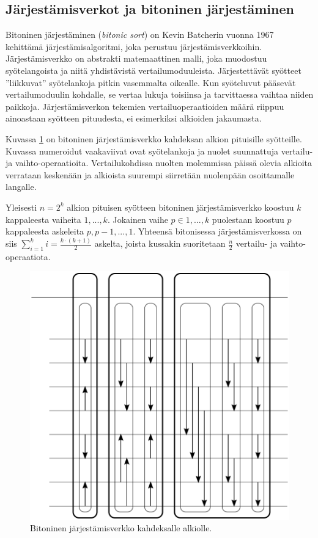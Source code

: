 \documentclass[a4paper,11pt]{article}
\newcommand{\engl}[1]{\foreignlanguage{english}{\em #1}}
\begin{document}
\subsection{Järjestämisverkot ja bitoninen järjestäminen}

Bitoninen järjestäminen (\engl{bitonic sort}) on Kevin Batcherin vuonna 1967 kehittämä järjestämisalgoritmi, joka perustuu järjestämisverkkoihin. Järjestämisverkko on abstrakti matemaattinen malli, joka muodostuu syötelangoista ja niitä yhdistävistä vertailumoduuleista. Järjestettävät syötteet ''liikkuvat'' syötelankoja pitkin vasemmalta oikealle. Kun syöteluvut pääsevät vertailumoduulin kohdalle, se vertaa lukuja toisiinsa ja tarvittaessa vaihtaa niiden paikkoja. Järjestämisverkon tekemien vertailuoperaatioiden määrä riippuu ainoastaan syötteen pituudesta, ei esimerkiksi alkioiden jakaumasta.

Kuvassa \ref{fig:bitonicsort} on bitoninen järjestämisverkko kahdeksan alkion pituisille syötteille. Kuvassa numeroidut vaakaviivat ovat syötelankoja ja nuolet suunnattuja vertailu- ja vaihto-operaatioita. Vertailukohdissa nuolten molemmissa päissä olevia alkioita verrataan keskenään ja alkioista suurempi siirretään nuolenpään osoittamalle langalle.

Yleisesti $n = 2^k$ alkion pituisen syötteen bitoninen järjestämisverkko koostuu $k$ kappaleesta vaiheita $1,...,k$. Jokainen vaihe $p \in 1,...,k$ puolestaan koostuu $p$ kappaleesta askeleita $p, p-1, ..., 1$. Yhteensä bitonisessa järjestämisverkossa on siis $\sum_{i = 1}^k i = \frac{k \cdot (k + 1)}{2}$ askelta, joista kussakin suoritetaan $\frac{n}{2}$ vertailu- ja vaihto-o\-pe\-raa\-ti\-o\-ta.

\begin{figure}
\centering
\includegraphics[scale = 0.8]{bitonic}
\caption{Bitoninen järjestämisverkko kahdeksalle alkiolle.}
\label{fig:bitonicsort}
\end{figure}
\end{document}
